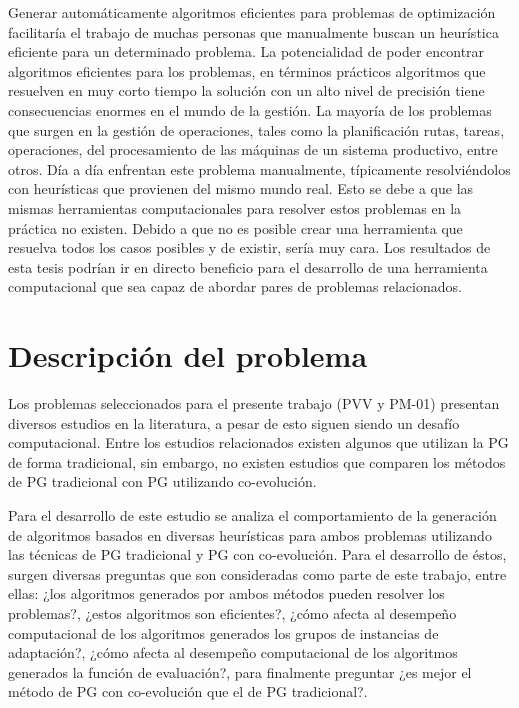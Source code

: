 Generar automáticamente algoritmos eficientes para problemas de optimización facilitaría el trabajo de muchas personas que manualmente buscan un heurística eficiente para un determinado problema. La potencialidad de poder encontrar algoritmos eficientes para los problemas, en términos prácticos algoritmos que resuelven en muy corto tiempo la solución con un alto nivel de precisión tiene consecuencias enormes en el mundo de la gestión. La mayoría de los problemas que surgen en la gestión de operaciones, tales como la planificación rutas, tareas, operaciones, del procesamiento de las máquinas de un sistema productivo, entre otros.  Día a día enfrentan este problema manualmente, típicamente resolviéndolos con heurísticas que provienen del mismo mundo real. Esto se debe a que las mismas herramientas computacionales para resolver estos problemas en la práctica no existen. Debido a que no es posible crear una herramienta que resuelva todos los casos posibles y de existir, sería muy cara. Los resultados de esta tesis podrían ir en directo beneficio para el desarrollo de una herramienta computacional que sea capaz de abordar pares de problemas relacionados.


\section{Descripción del problema}
\label{intro:problema}

Los problemas seleccionados para el presente trabajo (PVV y PM-01) presentan diversos estudios en la literatura, a pesar de esto siguen siendo un desafío computacional. Entre los estudios relacionados existen algunos que utilizan la PG de forma tradicional, sin embargo, no existen estudios que comparen los métodos de PG tradicional con PG utilizando co-evolución.

Para el desarrollo de este estudio se analiza el comportamiento de la generación de algoritmos basados en diversas heurísticas para ambos problemas utilizando las técnicas de PG tradicional y PG con co-evolución. Para el desarrollo de éstos, surgen diversas preguntas que son consideradas como parte de este trabajo, entre ellas: ¿los algoritmos generados por ambos métodos pueden resolver los problemas?, ¿estos algoritmos son eficientes?, ¿cómo afecta al desempeño computacional de los algoritmos generados los grupos de instancias de adaptación?, ¿cómo afecta al desempeño computacional de los algoritmos generados la función de evaluación?, para finalmente preguntar ¿es mejor el método de PG con co-evolución que el de PG tradicional?.


